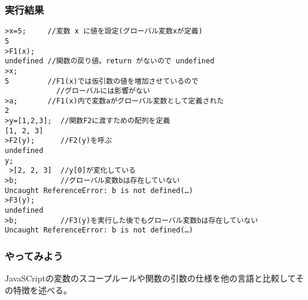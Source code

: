 \begin{frame}[containsverbatim]
 \frametitle{実行結果}
\begin{Verbatim}[fontsize=\footnotesize]
>x=5;     //変数 x に値を設定(グローバル変数xが定義)
5
>F1(x);
undefined //関数の戻り値。return がないので undefined
>x;
5         //F1(x)では仮引数の値を増加させているので
	        //グローバルには影響がない
>a;       //F1(x)内で変数aがグローバル変数として定義された
2
>y=[1,2,3];  //関数F2に渡すための配列を定義
[1, 2, 3]
>F2(y);      //F2(y)を呼ぶ
undefined
y;
 >[2, 2, 3]  //y[0]が変化している
>b;          //グローバル変数bは存在していない
Uncaught ReferenceError: b is not defined(…)
>F3(y);
undefined
>b;          //F3(y)を実行した後でもグローバル変数bは存在していない
Uncaught ReferenceError: b is not defined(…)
\end{Verbatim}
\end{frame}
\begin{frame}[containsverbatim]
 \frametitle{やってみよう}
JavaSCriptの変数のスコープルールや関数の引数の仕様を他の言語と比較してそ
 の特徴を述べる。
\end{frame}

